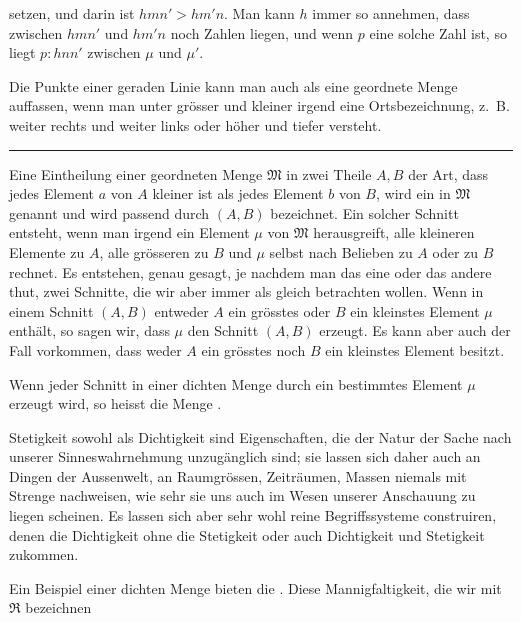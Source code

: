 setzen, und darin ist $hmn'>hm'n$. Man kann $h$ immer so
annehmen, dass zwischen $hmn'$ und $hm'n$ noch Zahlen liegen,
und wenn $p$ eine solche Zahl ist, so liegt $p:hnn'$ zwischen
$\mu$ und $\mu'$.

Die Punkte einer geraden Linie kann man auch als eine geordnete
Menge auffassen, wenn man unter grösser und kleiner irgend eine
Ortsbezeichnung, z.~B. weiter rechts und weiter links oder höher
und tiefer versteht.

\begin{center}
\rule{0.18\linewidth}{0.4pt}
\end{center}

Eine Eintheilung einer geordneten Menge $\mathfrak M$ in zwei Theile
$A,B$ der Art, dass jedes Element $a$ von $A$ kleiner ist als jedes
Element $b$ von $B$, wird ein  in $\mathfrak M$
genannt und wird passend durch $(A,B)$ bezeichnet. Ein solcher
Schnitt entsteht, wenn man irgend ein Element $\mu$ von $\mathfrak M$
herausgreift, alle kleineren Elemente zu $A$, alle grösseren zu $B$
und $\mu$ selbst nach Belieben zu $A$ oder zu $B$ rechnet. Es
entstehen, genau gesagt, je nachdem man das eine oder das andere
thut, zwei Schnitte, die wir aber immer als gleich betrachten wollen.
Wenn in einem Schnitt $(A,B)$ entweder $A$ ein grösstes oder $B$ ein
kleinstes Element $\mu$ enthält, so sagen wir, dass $\mu$ den Schnitt
$(A,B)$ erzeugt. Es kann aber auch der Fall vorkommen, dass weder $A$
ein grösstes noch $B$ ein kleinstes Element besitzt.

Wenn jeder Schnitt in einer dichten Menge durch ein bestimmtes
Element $\mu$ erzeugt wird, so heisst die Menge .

Stetigkeit sowohl als Dichtigkeit sind Eigenschaften, die der Natur
der Sache nach unserer Sinneswahrnehmung unzugänglich sind; sie lassen
sich daher auch an Dingen der Aussenwelt, an Raumgrössen, Zeiträumen,
Massen niemals mit Strenge nachweisen, wie sehr sie uns auch im Wesen
unserer Anschauung zu liegen scheinen. Es lassen sich aber sehr wohl
reine Begriffssysteme construiren, denen die Dichtigkeit ohne die
Stetigkeit oder auch Dichtigkeit und Stetigkeit zukommen\footnotemark[1].

Ein Beispiel einer dichten Menge bieten die . Diese Mannigfaltigkeit, die wir mit $\mathfrak R$ bezeichnen
